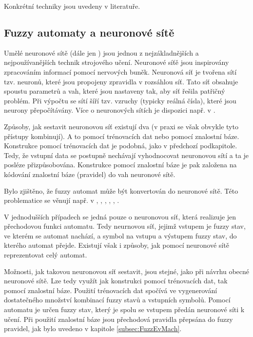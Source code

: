 \documentclass[a4paper,10pt]{article}
\begin{document}
Konkrétní techniky jsou uvedeny v literatuře. 

\subsection{Fuzzy automaty a neuronové sítě}
Umělé neuronové sítě (dále jen ) jsou jednou z nejzákladnějších a nejpoužívanějších technik strojového učení. Neuronové síťě jsou inspirovány zpracováním informací pomocí nervových buněk. Neuronová síť je tvořena sítí tzv. neuronů, které jsou propojeny zpravidla v rozsáhlou síť. Tato síť obsahuje spoustu parametrů a vah, které jsou nastaveny tak, aby síť řešila patřičný problém. Při výpočtu se sítí šíří tzv. vzruchy (typicky reálná čísla), které jsou neurony přepočítávány. Více o neuronových sítích je dispozici např. v \cite{FieRus-HanNeuCom}.

Způsoby, jak sestavit neuronovou síť existují dva (v praxi se však obvykle tyto přístupy kombinují). A to pomocí trénovacích dat nebo pomocí znalostní báze. Konstrukce pomocí trénovacích dat je podobná, jako v předchozí podkapitole. Tedy, že vstupní data se postupně nechávají vyhodnocovat neuronovou sítí a ta je posléze přizpůsobována. Konstrukce pomocí znalostní báze je pak založena na kódování znalostní báze (\ifthen pravidel) do vah neuronové sítě.

Bylo zjištěno, že fuzzy automat může být konvertován do neuronové sítě. Této problematice se věnují např. v \cite{DarAhmSin-AppFuzzAutTheKnBsNeuNetDevBasLeaMod}, \cite{OmlThoGil-FuzzFinStaAutCanDetEncIntRecNeuNet} \cite{BlaDelPeg-FuzzAutIndUsNeuNet}, \cite{GilOmlTho-EquKnoRep+}, \cite{OmlThoGil-RepFuzFinStaAuConRecNeuNet}, \cite{UnaKha-FuzDFinStaMachImpBasNeuFuzSys}, \cite{PedGac-LeaFuzzAut}.

V jednodušších případech se jedná pouze o neuronovou síť, která realizuje jen přechodovou funkci automatu. Tedy neurnovou síť, jejimž vstupem je fuzzy stav, ve kterém se automat nachází, a symbol na vstupu a výstupem fuzzy stav, do kterého automat přejde. Existují však i způsoby, jak pomocí neuronové sítě reprezentovat celý automat.

Možnosti, jak takovou neuronovou síť sestavit, jsou stejné, jako při návrhu obecné neuronové sítě. Lze tedy využít jak konstrukci pomocí trénovacích dat, tak pomocí znalostní báze. Použití trénovacích dat spočívá ve vygenerování dostatečného množství kombinací fuzzy stavů a vstupních symbolů. Pomocí automatu je určen  fuzzy stav, který je spolu se vstupem předán neuronové síti k učení. Při použití znalostní báze jsou přechodová pravidla přepsána do fuzzy \ifthen pravidel, jak bylo uvedeno v kapitole \ref{subsec:FuzzEvMach}.
\end{document}
